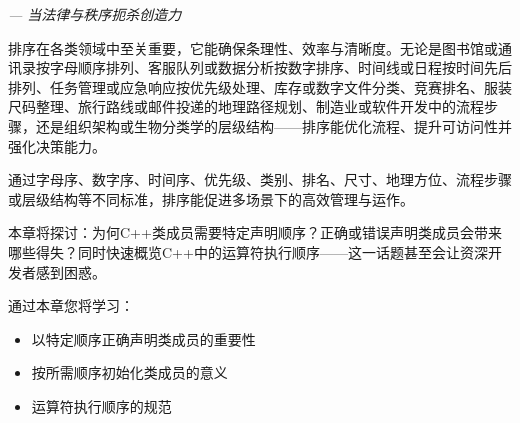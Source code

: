 
\begin{flushright}
\textit{--- 当法律与秩序扼杀创造力}
\end{flushright}

排序在各类领域中至关重要，它能确保条理性、效率与清晰度。无论是图书馆或通讯录按字母顺序排列、客服队列或数据分析按数字排序、时间线或日程按时间先后排列、任务管理或应急响应按优先级处理、库存或数字文件分类、竞赛排名、服装尺码整理、旅行路线或邮件投递的地理路径规划、制造业或软件开发中的流程步骤，还是组织架构或生物分类学的层级结构——排序能优化流程、提升可访问性并强化决策能力。

通过字母序、数字序、时间序、优先级、类别、排名、尺寸、地理方位、流程步骤或层级结构等不同标准，排序能促进多场景下的高效管理与运作。

本章将探讨：为何C++类成员需要特定声明顺序？正确或错误声明类成员会带来哪些得失？同时快速概览C++中的运算符执行顺序——这一话题甚至会让资深开发者感到困惑。

通过本章您将学习：

\begin{itemize}
\item 
以特定顺序正确声明类成员的重要性

\item 
按所需顺序初始化类成员的意义

\item 
运算符执行顺序的规范
\end{itemize}













